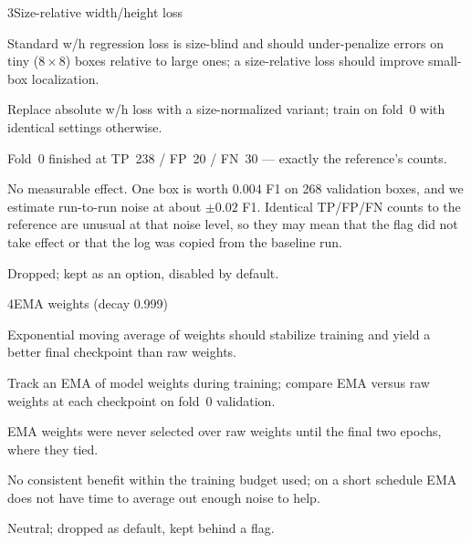 \begin{explog}{3}{Size-relative width/height loss}
\item[Hypothesis] Standard w/h regression loss is size-blind and should under-penalize errors on tiny ($8\times8$) boxes relative to large ones; a size-relative loss should improve small-box localization.
\item[Method] Replace absolute w/h loss with a size-normalized variant; train on fold~0 with identical settings otherwise.
\item[Result] Fold~0 finished at TP~238 / FP~20 / FN~30 --- exactly the reference's counts.
\item[Inference] No measurable effect. One box is worth 0.004 F1 on 268 validation boxes, and we estimate run-to-run noise at about $\pm0.02$ F1. Identical TP/FP/FN counts to the reference are unusual at that noise level, so they may mean that the flag did not take effect or that the log was copied from the baseline run.
\item[Verdict] Dropped; kept as an option, disabled by default.
\end{explog}


\begin{explog}{4}{EMA weights (decay 0.999)}
\item[Hypothesis] Exponential moving average of weights should stabilize training and yield a better final checkpoint than raw weights.
\item[Method] Track an EMA of model weights during training; compare EMA versus raw weights at each checkpoint on fold~0 validation.
\item[Result] EMA weights were never selected over raw weights until the final two epochs, where they tied.
\item[Inference] No consistent benefit within the training budget used; on a short schedule EMA does not have time to average out enough noise to help.
\item[Verdict] Neutral; dropped as default, kept behind a flag.
\end{explog}



